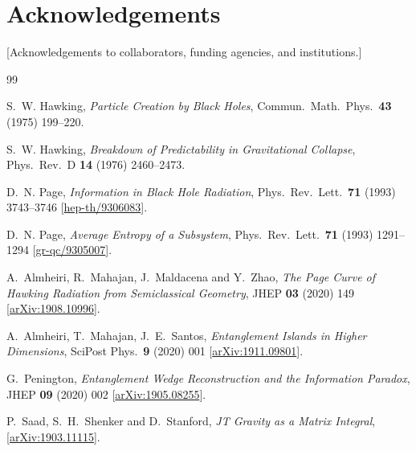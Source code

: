 \documentclass[12pt,a4paper]{article}
\begin{document}
\section*{Acknowledgements}

[Acknowledgements to collaborators, funding agencies, and institutions.]



\begin{thebibliography}{99}

S.~W. Hawking,
\textit{Particle Creation by Black Holes},
Commun.\ Math.\ Phys.\ \textbf{43} (1975) 199--220.

S.~W. Hawking,
\textit{Breakdown of Predictability in Gravitational Collapse},
Phys.\ Rev.\ D \textbf{14} (1976) 2460--2473.

D.~N. Page,
\textit{Information in Black Hole Radiation},
Phys.\ Rev.\ Lett.\ \textbf{71} (1993) 3743--3746
[\href{https://arxiv.org/abs/hep-th/9306083}{hep-th/9306083}].

D.~N. Page,
\textit{Average Entropy of a Subsystem},
Phys.\ Rev.\ Lett.\ \textbf{71} (1993) 1291--1294
[\href{https://arxiv.org/abs/gr-qc/9305007}{gr-qc/9305007}].

A.~Almheiri, R.~Mahajan, J.~Maldacena and Y.~Zhao,
\textit{The Page Curve of Hawking Radiation from Semiclassical Geometry},
JHEP \textbf{03} (2020) 149
[\href{https://arxiv.org/abs/1908.10996}{arXiv:1908.10996}].

A.~Almheiri, T.~Mahajan, J.~E.~Santos,
\textit{Entanglement Islands in Higher Dimensions},
SciPost Phys.\ \textbf{9} (2020) 001
[\href{https://arxiv.org/abs/1911.09801}{arXiv:1911.09801}].

G.~Penington,
\textit{Entanglement Wedge Reconstruction and the Information Paradox},
JHEP \textbf{09} (2020) 002
[\href{https://arxiv.org/abs/1905.08255}{arXiv:1905.08255}].

P.~Saad, S.~H.~Shenker and D.~Stanford,
\textit{JT Gravity as a Matrix Integral},
[\href{https://arxiv.org/abs/1903.11115}{arXiv:1903.11115}].


\end{thebibliography}
\end{document}
